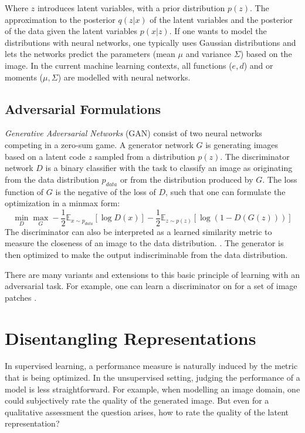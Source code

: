 		Where $z$ introduces latent variables, with a prior distribution $p(z)$. The approximation to the posterior $q(z|x)$ of the latent variables and the posterior of the data given the latent variables $p(x|z)$. If one wants to model the distributions with neural networks, one typically uses Gaussian distributions and lets the networks predict the parameters (mean $\mu$ and variance $\Sigma$) based on the image.
		In the current machine learning contexts, all functions ($e, d$) and or moments ($\mu, \Sigma$) are modelled with neural networks.

	\subsection{Adversarial Formulations}\label{sec:adversarial}
		\textit{Generative Adversarial Networks} (GAN) consist of two neural networks competing in a zero-sum game. A generator network $G$ is generating images based on a latent code $z$ sampled from a distribution $p(z)$. The discriminator network $D$ is a binary classifier with the task to classify an image as originating from the data distribution $p_{data}$ or from the distribution produced by $G$. The loss function of $G$ is the negative of the loss of $D$, such that one can formulate the optimization in a minmax form:
		\begin{equation}
				\min_D \max_G - \frac{1}{2} \mathds{E}_{x\sim p_{data}}[\log D(x)] - \frac{1}{2}\mathds{E}_{z\sim p(z)}[\log (1-D(G(z)))]
		\end{equation}
		The discriminator can also be interpreted as a learned similarity metric to measure the closeness of an image to the data distribution. \cite{Larsen2015AutoencodingMetric}. The generator is then optimized to make the output indiscriminable from the data distribution.

		There are many variants and extensions to this basic principle of learning with an adversarial task. For example, one can learn a discriminator on for a set of image patches \cite{Isola2017image}. 

\section{Disentangling Representations}\label{sec:disentangled}
	In supervised learning, a performance measure is naturally induced by the metric that is being optimized. In the unsupervised setting, judging the performance of a model is less straightforward. For example, when modelling an image domain, one could subjectively rate the quality of the generated image. But even for a qualitative assessment the question arises, how to rate the quality of the latent representation?

